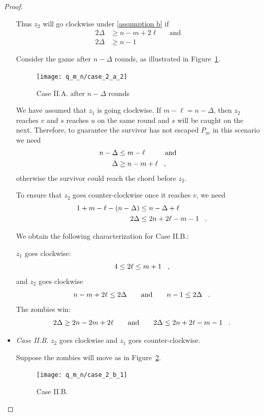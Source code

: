 \begin{proof}
\begin{proofpart}
\begin{itemize}
  Thus $z_2$ will go clockwise under \ref{assumption b} if
  \begin{align*}
   2\Delta &\geq n-m+2\ell && \text{and} \\
    2\Delta &\geq n-1
  \end{align*}

  Consider the game after $n-\Delta$ rounds, as illustrated in Figure~\ref{fig:case_2_a_2}.

  \begin{figure}
    \centering
    \texttt{[image: q\_m\_n/case\_2\_a\_2]}
    \caption{Case II.A. after $n-\Delta$ rounds \label{fig:case_2_a_2}}
  \end{figure}

  We have assumed that $z_1$ is going clockwise. If $m - \ell = n - \Delta$,
  then $z_2$ reaches $v$ and $s$ reaches $u$ on the same round and $s$
  will be caught on the next. Therefore, to guarantee the survivor has not
  escaped $P_m$ in this scenario we need
  \begin{align*}
   n - \Delta &\leq m - \ell   && \text{and}  \\
   \Delta &\geq n - m + \ell \mcomma
  \end{align*}
  otherwise the survivor could reach the chord before $z_2$.

  To ensure that $z_2$ goes counter-clockwise once it reaches $v$, we need
  \begin{align*}
   1 + m - \ell - (n - \Delta) &\leq n - \Delta + \ell  \\
   2 \Delta &\leq 2n + 2\ell - m - 1 \mperiod
  \end{align*}

  We obtain the following characterization for Case II.B.:

  $z_1$ goes clockwise:
  \[ 4 \leq 2 \ell \leq m + 1 \mcomma \]
  and $z_2$ goes clockwise
  \[ n -m + 2\ell \leq 2 \Delta \qquad \text{and} \qquad n-1 \leq 2 \Delta \mperiod \]
  The zombies win:
  \[ 2 \Delta \geq 2n - 2m + 2\ell \qquad \text{and} \qquad 2 \Delta \leq 2n + 2\ell - m - 1 \mperiod\]


  \item \textit{Case II.B.} $z_2$ goes clockwise and $z_1$ goes counter-clockwise.

  Suppose the zombies will move as in Figure~\ref{fig:case_2_b_1}.
  \begin{figure}
    \centering
    \texttt{[image: q\_m\_n/case\_2\_b\_1]}
    \caption{Case II.B. \label{fig:case_2_b_1}}
  \end{figure}


\end{itemize}
\end{proofpart}
\end{proof}
